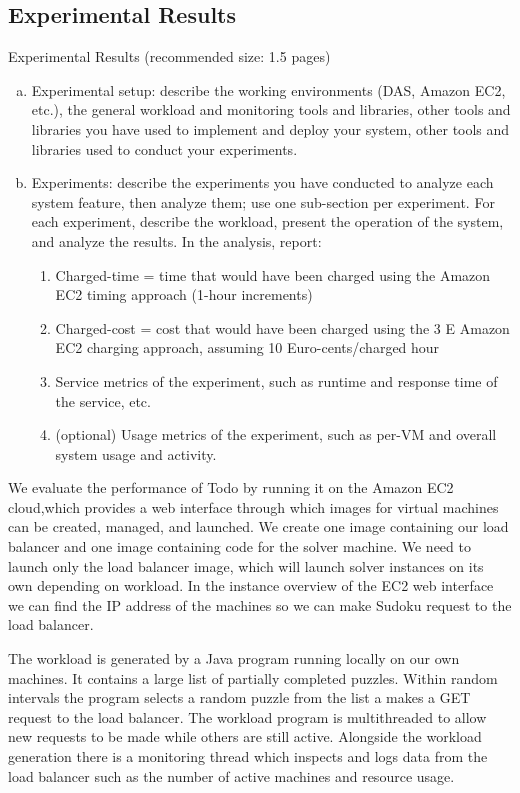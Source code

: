 \documentclass[twoside]{article}
\newcommand{\appName}{Todo }
\begin{document}
\begin{multicols}{2}
\section{Experimental Results}
Experimental Results (recommended size: 1.5 pages)
\begin{enumerate}[(a)]
\item Experimental setup: describe the working environments (DAS, Amazon EC2,
etc.), the general workload and monitoring tools and libraries, other tools and libraries you have used to implement and deploy your system, other tools and libraries used to conduct your experiments.
\item Experiments: describe the experiments you have conducted to analyze each system feature, then analyze them; use one sub-section per experiment. For each experiment, describe the workload, present the operation of the system, and analyze the results. In the analysis, report:
\begin{enumerate}
\item Charged-time = time that would have been charged using the Amazon EC2 timing approach (1-hour increments)
\item Charged-cost = cost that would have been charged using the 3
E
Amazon EC2 charging approach, assuming 10 Euro-cents/charged hour
\item Service metrics of the experiment, such as runtime and response time of
the service, etc.
\item (optional) Usage metrics of the experiment, such as per-VM and overall
system usage and activity.
\end{enumerate}
\end{enumerate}
We evaluate the performance of \appName by running it on the Amazon EC2 cloud,which provides a web interface through which images for virtual machines can be created, managed, and launched. We create one image containing our load balancer and one image containing code for the solver machine. We need to launch only the load balancer image, which will launch solver instances on its own depending on workload. In the instance overview of the EC2 web interface we can find the IP address of the machines so we can make Sudoku request to the load balancer. 

The workload is generated by a Java program running locally on our own machines. It contains a large list of partially completed puzzles. Within random intervals the program selects a random puzzle from the list a makes a GET request to the load balancer.   
The workload program is multithreaded to allow new requests to be made while others are still active. Alongside the workload generation there is a monitoring thread which inspects and logs data from the load balancer such as the number of active machines and resource usage.


\end{multicols}
\end{document}

